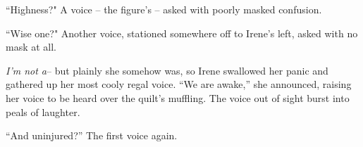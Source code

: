 \documentclass[../FGP.tex]{subfiles}
\begin{document}
\begin{fragment}
``Highness?" A voice -- the figure's -- asked with poorly masked confusion.

``Wise one?" Another voice, stationed somewhere off to Irene's left, asked with no mask at all.

\emph{I'm not a}-- but plainly she somehow was, so Irene swallowed her panic and gathered up her most cooly regal voice. ``We are awake,'' she announced, raising her voice to be heard over the quilt's muffling. The voice out of sight burst into peals of laughter. 

``And uninjured?'' The first voice again.





\end{fragment}
\end{document}
